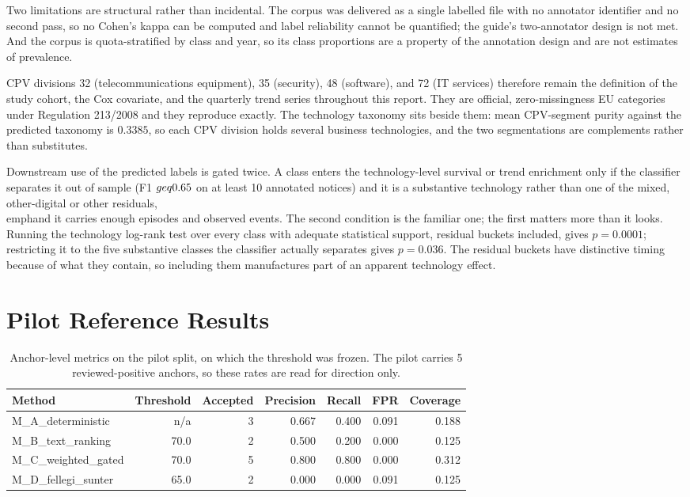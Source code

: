 \documentclass[11pt,a4paper]{article}
\begin{document}
Two limitations are structural rather than incidental. The corpus was delivered
as a single labelled file with no annotator identifier and no second pass, so no
Cohen's kappa can be computed and label reliability cannot be quantified; the
guide's two-annotator design is not met. And the corpus is quota-stratified by
class and year, so its class proportions are a property of the annotation design
and are not estimates of prevalence.

CPV divisions 32 (telecommunications equipment), 35 (security), 48 (software),
and 72 (IT services) therefore remain the definition of the study cohort, the
Cox covariate, and the quarterly trend series throughout this report. They are
official, zero-missingness EU categories under Regulation 213/2008 and they
reproduce exactly. The technology taxonomy sits beside them: mean CPV-segment
purity against the predicted taxonomy is $0.3385$, so each CPV division holds
several business technologies, and the two segmentations are complements rather
than substitutes.

Downstream use of the predicted labels is gated twice. A class enters the
technology-level survival or trend enrichment only if the classifier separates
it out of sample (F1 $\\geq 0.65$ on at least 10 annotated notices) and it is a
substantive technology rather than one of the mixed, other-digital or other
residuals, \\emph{and} it carries enough episodes and observed events. The
second condition is the familiar one; the first matters more than it looks.
Running the technology log-rank test over every class with adequate statistical
support, residual buckets included, gives $p = 0.0001$; restricting it to the
five substantive classes the classifier actually separates gives $p = 0.036$.
The residual buckets have distinctive timing because of what they contain, so
including them manufactures part of an apparent technology effect.

\section{Pilot Reference Results}
\begin{table}[H]
\centering
\small
\begin{tabularx}{\textwidth}{lrrrrrr}
\toprule
Method & Threshold & Accepted & Precision & Recall & FPR & Coverage \\
\midrule
M\_A\_deterministic & n/a & 3 & 0.667 & 0.400 & 0.091 & 0.188 \\
M\_B\_text\_ranking & 70.0 & 2 & 0.500 & 0.200 & 0.000 & 0.125 \\
M\_C\_weighted\_gated & 70.0 & 5 & 0.800 & 0.800 & 0.000 & 0.312 \\
M\_D\_fellegi\_sunter & 65.0 & 2 & 0.000 & 0.000 & 0.091 & 0.125 \\
\bottomrule
\end{tabularx}
\caption{Anchor-level metrics on the pilot split, on which the threshold was
frozen. The pilot carries 5 reviewed-positive anchors,
so these rates are read for direction only.}
\end{table}
\end{document}
